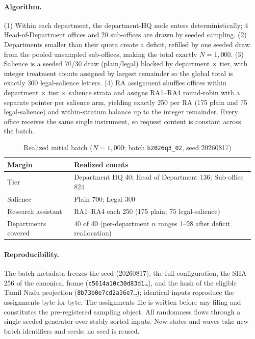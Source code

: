 \documentclass[11pt]{article}
\begin{document}
\paragraph{Algorithm.} (1) Within each department, the department-HQ node enters deterministically; 4 Head-of-Department offices and 20 sub-offices are drawn by seeded sampling. (2) Departments smaller than their quota create a deficit, refilled by one seeded draw from the pooled unsampled sub-offices, making the total exactly $N=1{,}000$. (3) Salience is a seeded 70/30 draw (plain/legal) blocked by department $\times$ tier, with integer treatment counts assigned by largest remainder so the global total is exactly 300 legal-salience letters. (4) RA assignment shuffles offices within department $\times$ tier $\times$ salience strata and assigns RA1--RA4 round-robin with a separate pointer per salience arm, yielding exactly 250 per RA (175 plain and 75 legal-salience) and within-stratum balance up to the integer remainder. Every office receives the same single instrument, so request content is constant across the batch.

\begin{table}[htbp]
\centering
\caption{Realized initial batch ($N=1{,}000$; batch \texttt{b2026q3\_02}, seed 20260817)}
\begin{tabularx}{\textwidth}{lL}
\toprule
Margin & Realized counts \\
\midrule
Tier & Department HQ 40; Head of Department 136; Sub-office 824 \\
Salience & Plain 700; Legal 300 \\
Research assistant & RA1--RA4 each 250 (175 plain; 75 legal-salience) \\
Departments covered & 40 of 40 (per-department $n$ ranges 1--98 after deficit reallocation) \\
\bottomrule
\end{tabularx}
\end{table}

\paragraph{Reproducibility.} The batch metadata freezes the seed (20260817), the full configuration, the SHA-256 of the canonical frame (\texttt{c5614a10c30d83d1\ldots}), and the hash of the eligible Tamil Nadu projection (\texttt{8b73b0e7cd2a36e7\ldots}); identical inputs reproduce the assignments byte-for-byte. The assignments file is written before any filing and constitutes the pre-registered sampling object. All randomness flows through a single seeded generator over stably sorted inputs. New states and waves take new batch identifiers and seeds; no seed is reused.
\end{document}
